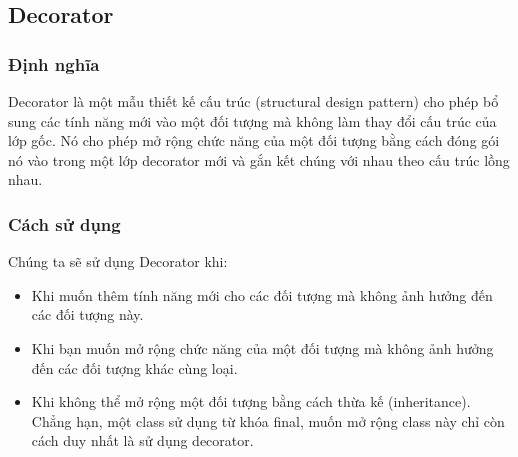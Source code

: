 \subsection{Decorator}
\subsubsection{Định nghĩa}
Decorator là một mẫu thiết kế cấu trúc (structural design pattern) cho phép bổ sung các tính năng mới vào một đối tượng mà không làm thay đổi cấu trúc của lớp gốc. Nó cho phép mở rộng chức năng của một đối tượng bằng cách đóng gói nó vào trong một lớp decorator mới và gắn kết chúng với nhau theo cấu trúc lồng nhau.
\subsubsection{Cách sử dụng}
Chúng ta sẽ sử dụng Decorator khi:
\begin{itemize}
    \item Khi muốn thêm tính năng mới cho các đối tượng mà không ảnh hưởng đến các đối tượng này.
    \item Khi bạn muốn mở rộng chức năng của một đối tượng mà không ảnh hưởng đến các đối tượng khác cùng loại.
    \item Khi không thể mở rộng một đối tượng bằng cách thừa kế (inheritance). Chẳng hạn, một class sử dụng từ khóa final, muốn mở rộng class này chỉ còn cách duy nhất là sử dụng decorator.
\end{itemize}
